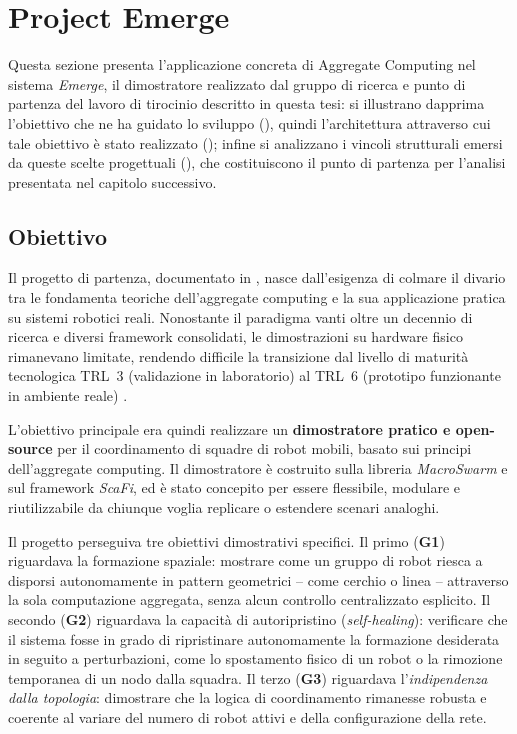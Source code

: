 \section{Project Emerge}
\label{sec:progetto-allo-stato-attuale}
%
Questa sezione presenta l'applicazione concreta di Aggregate Computing nel sistema \textit{Emerge}, il dimostratore realizzato dal gruppo di ricerca e punto di partenza del lavoro di tirocinio descritto in questa tesi: si illustrano dapprima l'obiettivo che ne ha guidato lo sviluppo (), quindi l'architettura attraverso cui tale obiettivo è stato realizzato (); infine si analizzano i vincoli strutturali emersi da queste scelte progettuali (), che costituiscono il punto di partenza per l'analisi presentata nel capitolo successivo.
%
\subsection{Obiettivo}
\label{subsec:obbiettivo}
%
Il progetto di partenza, documentato in \cite{aguzzi2025demo}, nasce dall'esigenza di colmare il divario tra le fondamenta teoriche dell'aggregate computing e la sua applicazione pratica su sistemi robotici reali. Nonostante il paradigma vanti oltre un decennio di ricerca e diversi framework consolidati, le dimostrazioni su hardware fisico rimanevano limitate, rendendo difficile la transizione dal livello di maturità tecnologica TRL~3 (validazione in laboratorio) al TRL~6 (prototipo funzionante in ambiente reale) \cite{olechowski2015trl}.

L'obiettivo principale era quindi realizzare un \textbf{dimostratore pratico e open-source} per il coordinamento di squadre di robot mobili, basato sui principi dell'aggregate computing. Il dimostratore è costruito sulla libreria \textit{MacroSwarm} e sul framework \textit{ScaFi}, ed è stato concepito per essere flessibile, modulare e riutilizzabile da chiunque voglia replicare o estendere scenari analoghi.

Il progetto perseguiva tre obiettivi dimostrativi specifici. Il primo (\textbf{G1}) riguardava la formazione spaziale: mostrare come un gruppo di robot riesca a disporsi autonomamente in pattern geometrici -- come cerchio o linea -- attraverso la sola computazione aggregata, senza alcun controllo centralizzato esplicito. Il secondo (\textbf{G2}) riguardava la capacità di autoripristino (\textit{self-healing}): verificare che il sistema fosse in grado di ripristinare autonomamente la formazione desiderata in seguito a perturbazioni, come lo spostamento fisico di un robot o la rimozione temporanea di un nodo dalla squadra. Il terzo (\textbf{G3}) riguardava l'\textit{indipendenza dalla topologia}: dimostrare che la logica di coordinamento rimanesse robusta e coerente al variare del numero di robot attivi e della configurazione della rete.


